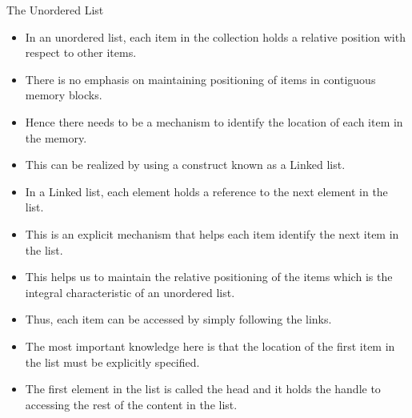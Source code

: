 \documentclass{beamer}
\begin{document}
\begin{frame}
The Unordered List

\begin{itemize}

\item In an unordered list, each item in the collection holds a relative position with respect to other items.

\item There is no emphasis on maintaining positioning of items in contiguous memory blocks.

\item Hence there needs to be a mechanism to identify the location of each item in the memory.

\item This can be realized by using a construct known as a Linked list.

\item In a Linked list, each element holds a reference to the next element in the list.	

\item This is an explicit mechanism that helps each item identify the next item in the list.

\end{itemize}
\end{frame}

\begin{frame}
\begin{itemize}

\item This helps us to maintain the relative positioning of the items which is the integral characteristic of an unordered list.

\item Thus, each item can be accessed by simply following the links.

\item The most important knowledge here is that the location of the first item in the list must be explicitly specified.

\item The first element in the list is called the head and it holds the handle to accessing the rest of the content in the list.

\end{itemize}
\end{frame}
\end{document}
